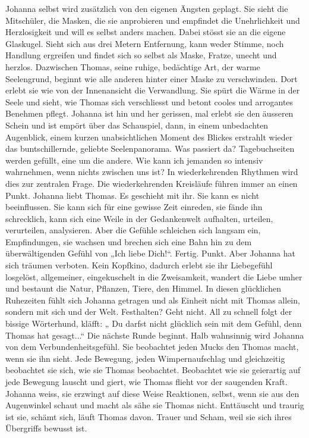 Johanna selbst wird zusätzlich von den eigenen Ängsten geplagt. Sie sieht die Mitschüler, die Masken, die sie anprobieren und empfindet die Unehrlichkeit und Herzlosigkeit und will es selbst anders machen. Dabei stösst sie an die eigene Glaskugel. Sieht sich aus drei Metern Entfernung, kann weder Stimme, noch Handlung ergreifen und findet sich so selbst als Maske, Fratze, unecht und herzlos.
Dazwischen Thomas, seine ruhige, bedächtige Art, der warme Seelengrund, beginnt wie alle anderen hinter einer Maske zu verschwinden. Dort erlebt sie wie von der Innenansicht die Verwandlung. Sie spürt die Wärme in der Seele und sieht, wie Thomas sich verschliesst und betont cooles und arrogantes Benehmen pflegt. 
Johanna ist hin und her gerissen, mal erlebt sie den äusseren Schein und ist empört über das Schauspiel, dann, in einem unbedachten Augenblick, einem kurzen unabsichtlichen Moment des Blickes erstrahlt wieder das buntschillernde, geliebte Seelenpanorama. 
Was passiert da?
Tagebuchseiten werden gefüllt, eine um die andere. Wie kann ich jemanden so intensiv wahrnehmen, wenn nichts zwischen uns ist? In wiederkehrenden Rhythmen wird dies zur zentralen Frage. 
Die wiederkehrenden Kreisläufe führen immer an einen Punkt. Johanna liebt Thomas. Es geschieht mit ihr. Sie kann es nicht beeinflussen. Sie kann sich für eine gewisse Zeit einreden, sie fände ihn schrecklich, kann sich eine Weile in der Gedankenwelt  aufhalten, urteilen, verurteilen, analysieren. Aber die Gefühle schleichen sich langsam ein, Empfindungen, sie wachsen und brechen sich  eine Bahn hin zu dem überwältigenden Gefühl von „Ich liebe Dich!“.  Fertig. Punkt.
Aber Johanna hat sich träumen verboten. Kein Kopfkino, dadurch erlebt sie ihr Liebegefühl losgelöst, allgemeiner, eingekuschelt in die Zweisamkeit, wandert die Liebe umher und bestaunt die Natur, Pflanzen, Tiere, den Himmel. In diesen glücklichen Ruhezeiten fühlt sich Johanna getragen und als Einheit nicht mit Thomas allein, sondern mit sich und der Welt. Festhalten? Geht nicht. All zu schnell folgt der bissige Wörterhund, kläfft: „ Du darfst nicht glücklich sein mit dem Gefühl, denn Thomas hat gesagt...“ Die nächste Runde beginnt.
Halb wahnsinnig wird Johanna von dem Verbundenheitsgefühl. Sie beobachtet jeden Mucks den Thomas macht, wenn sie ihn sieht. Jede Bewegung, jeden Wimpernaufschlag und gleichzeitig beobachtet sie sich, wie sie Thomas beobachtet. Beobachtet wie sie geierartig auf jede Bewegung lauscht und giert, wie Thomas flieht vor der saugenden Kraft. Johanna weiss, sie erzwingt auf diese Weise Reaktionen, selbst, wenn sie aus den Augenwinkel schaut und macht als sähe sie Thomas nicht. Enttäuscht und traurig ist sie, schämt sich, läuft Thomas davon. Trauer und Scham, weil sie sich ihres Übergriffs bewusst ist. 
